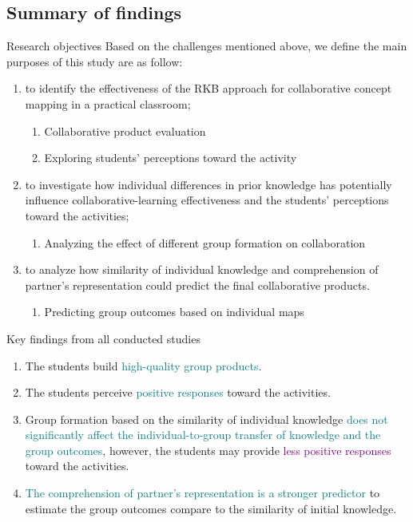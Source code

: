 \subsection{Summary of findings}

\begin{frame}{Research objectives}
    Based on the challenges mentioned above, we define the main purposes of this study are as follow: 
    \begin{enumerate}[A]
        \item {\color{blue}to identify the effectiveness of the RKB approach for collaborative concept mapping in a practical classroom};
        \begin{enumerate}
            \item Collaborative product evaluation
            \item  Exploring students' perceptions toward the activity
        \end{enumerate}
        
        \item {\color{blue} to investigate how individual differences in prior knowledge has potentially influence collaborative-learning effectiveness and the students' perceptions toward the activities}; 
        \begin{enumerate}[3]
            \item Analyzing the effect of different group formation on collaboration
        \end{enumerate}
        
        \item {\color{blue} to analyze how similarity of individual knowledge and comprehension  of partner's representation could predict the final collaborative products}.
        \begin{enumerate}[4]
            \item Predicting group outcomes based on individual maps
        \end{enumerate}
    \end{enumerate} 
\end{frame}

\begin{frame}{Key findings from all conducted studies}
    \begin{enumerate}
    \item <1-> [RO:A] The students build \textcolor{teal}{high-quality group products}. 
    \item <2-> [RO:A] The students perceive \textcolor{teal}{positive responses} toward the activities. 
    \item <3-> [RO:B] Group formation based on the similarity of individual 
    knowledge \textcolor{teal}{does not significantly affect the individual-to-group 
    transfer of knowledge and the group outcomes}, however, 
    the students may provide \textcolor{purple}{less positive responses} toward the activities.
    \item <4-> [RO:C] \textcolor{teal}{The comprehension of partner's representation is a 
    stronger predictor} to estimate the group outcomes compare to the similarity of initial knowledge. 
\end{enumerate}  
\end{frame}

